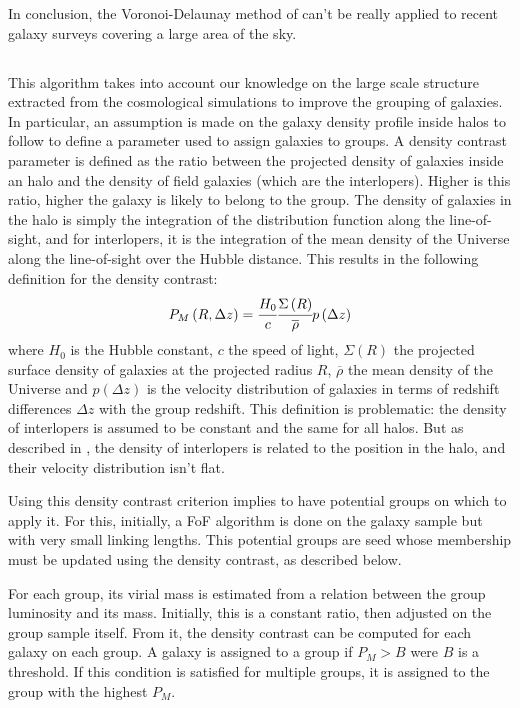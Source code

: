 In conclusion, the Voronoi-Delaunay method of \citet{Marinoni+02} can't be
really applied to recent galaxy surveys covering a large area of the sky.

\subsection{\citet{Yang+07}}
\label{sub:yang07}

This algorithm takes into account our knowledge on the large scale structure
extracted from the cosmological simulations to improve the grouping of
galaxies. In particular, an assumption is made on the galaxy density profile
inside halos to follow \citet{NFW+97} to define a parameter used to assign
galaxies to groups. A density contrast parameter is defined as the ratio
between the projected density of galaxies inside an halo and the density of
field galaxies (which are the interlopers). Higher is this ratio, higher the
galaxy is likely to belong to the group. The density of galaxies in the halo is
simply the integration of the distribution function along the line-of-sight,
and for interlopers, it is the integration of the mean density of the Universe
along the line-of-sight over the Hubble distance. This results in the following
definition for the density contrast:
%
\begin{equation}
    P_M \left(R, \Delta z\right)=\cfrac{H_0}{c} \cfrac{\Sigma
    \left(R\right)}{\overline{\rho}} p \left(\Delta z\right)
\end{equation}
%
where $H_0$ is the Hubble constant, $c$ the speed of light,
$\Sigma\left(R\right)$ the projected surface density of galaxies at the
projected radius $R$, $\overline{\rho}$ the mean density of the Universe and $p
\left(\Delta z\right)$ is the velocity distribution of galaxies in terms of
redshift differences $\Delta z$ with the group redshift. This definition is
problematic: the density of interlopers is assumed to be constant and the same
for all halos. But as described in \citet{MBM+10}, the density of interlopers
is related to the position in the halo, and their velocity distribution isn't
flat.

Using this density contrast criterion implies to have potential groups on which
to apply it. For this, initially, a FoF algorithm is done on the galaxy sample
but with very small linking lengths. This potential groups are seed whose
membership must be updated using the density contrast, as described below.

For each group, its virial mass is estimated from a relation between the group
luminosity and its mass. Initially, this is a constant ratio, then adjusted on
the group sample itself. From it, the density contrast can be computed for each
galaxy on each group. A galaxy is assigned to a group if $P_M>B$ were $B$ is a
threshold. If this condition is satisfied for multiple groups, it is assigned
to the group with the highest $P_M$.

